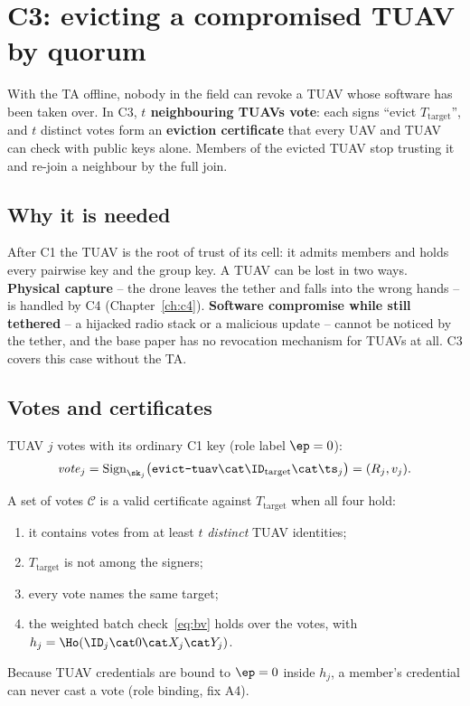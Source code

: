 \chapter{C3: evicting a compromised TUAV by quorum}\label{ch:c3}
\begin{keybox}[colframe=quorum,colback=quorum!5]
With the TA offline, nobody in the field can revoke a TUAV whose software has been taken over. In C3, \textbf{$t$ neighbouring TUAVs vote}: each
signs ``evict $T_{\mathrm{target}}$'', and $t$ distinct votes form an \textbf{eviction certificate} that every UAV and TUAV can check with public keys
alone. Members of the evicted TUAV stop trusting it and re-join a neighbour by the full join.
\end{keybox}

\section{Why it is needed}
After C1 the TUAV is the root of trust of its cell: it admits members and holds every pairwise key and the group key. A TUAV can be lost in two ways.
\textbf{Physical capture} -- the drone leaves the tether and falls into the wrong hands -- is handled by C4 (Chapter~\ref{ch:c4}). \textbf{Software
compromise while still tethered} -- a hijacked radio stack or a malicious update -- cannot be noticed by the tether, and the base paper has no revocation
mechanism for TUAVs at all. C3 covers this case without the TA.

\section{Votes and certificates}
TUAV $j$ votes with its ordinary C1 key (role label $\ep=0$):
\[
\mathit{vote}_j=\mathrm{Sign}_{\sk_j}\big(\texttt{evict-tuav}\cat\ID_{\mathrm{target}}\cat\ts_j\big)=(R_j,v_j).
\]
\begin{definition}\label{def:cert}
A set of votes $\mathcal C$ is a valid certificate against $T_{\mathrm{target}}$ when all four hold:
\begin{enumerate}[leftmargin=*,label=\textbf{V\arabic*.}]
\item it contains votes from at least $t$ \emph{distinct} TUAV identities;
\item $T_{\mathrm{target}}$ is not among the signers;
\item every vote names the same target;
\item the weighted batch check~\eqref{eq:bv} holds over the votes, with $h_j=\Ho(\ID_j\cat0\cat X_j\cat Y_j)$.
\end{enumerate}
\end{definition}
\noindent Because TUAV credentials are bound to $\ep=0$ inside $h_j$, a member's credential can never cast a vote (role binding, fix A4).

